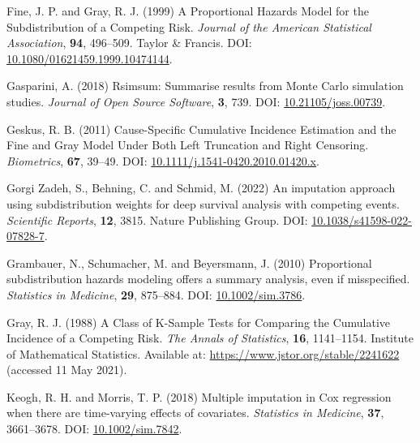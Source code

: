 \documentclass[
  letterpaper,
  DIV=11,
  numbers=noendperiod]{scrreprt}
\newlength{\cslhangindent}
\newlength{\cslentryspacingunit} %
\newenvironment{CSLReferences}[2] %
 {%
  \setlength{\parindent}{0pt}
  \ifodd #1
  \let\oldpar\par
  \def\par{\hangindent=\cslhangindent\oldpar}
  \fi
  \setlength{\parskip}{#2\cslentryspacingunit}
 }%
 {}
\begin{document}
\begin{CSLReferences}{1}{0}
\leavevmode{}%
Fine, J. P. and Gray, R. J. (1999) A {Proportional Hazards Model} for
the {Subdistribution} of a {Competing Risk}. \emph{Journal of the
American Statistical Association}, \textbf{94}, 496--509. Taylor \&
Francis. DOI:
\href{https://doi.org/10.1080/01621459.1999.10474144}{10.1080/01621459.1999.10474144}.

\leavevmode{}%
Gasparini, A. (2018) Rsimsum: {Summarise} results from {Monte Carlo}
simulation studies. \emph{Journal of Open Source Software}, \textbf{3},
739. DOI:
\href{https://doi.org/10.21105/joss.00739}{10.21105/joss.00739}.

\leavevmode{}%
Geskus, R. B. (2011) Cause-{Specific Cumulative Incidence Estimation}
and the {Fine} and {Gray Model Under Both Left Truncation} and {Right
Censoring}. \emph{Biometrics}, \textbf{67}, 39--49. DOI:
\href{https://doi.org/10.1111/j.1541-0420.2010.01420.x}{10.1111/j.1541-0420.2010.01420.x}.

\leavevmode{}%
Gorgi Zadeh, S., Behning, C. and Schmid, M. (2022) An imputation
approach using subdistribution weights for deep survival analysis with
competing events. \emph{Scientific Reports}, \textbf{12}, 3815. Nature
Publishing Group. DOI:
\href{https://doi.org/10.1038/s41598-022-07828-7}{10.1038/s41598-022-07828-7}.

\leavevmode{}%
Grambauer, N., Schumacher, M. and Beyersmann, J. (2010) Proportional
subdistribution hazards modeling offers a summary analysis, even if
misspecified. \emph{Statistics in Medicine}, \textbf{29}, 875--884. DOI:
\href{https://doi.org/10.1002/sim.3786}{10.1002/sim.3786}.

\leavevmode{}%
Gray, R. J. (1988) A {Class} of {K-Sample Tests} for {Comparing} the
{Cumulative Incidence} of a {Competing Risk}. \emph{The Annals of
Statistics}, \textbf{16}, 1141--1154. Institute of Mathematical
Statistics. Available at: \url{https://www.jstor.org/stable/2241622}
(accessed 11 May 2021).

\leavevmode{}%
Keogh, R. H. and Morris, T. P. (2018) Multiple imputation in {Cox}
regression when there are time-varying effects of covariates.
\emph{Statistics in Medicine}, \textbf{37}, 3661--3678. DOI:
\href{https://doi.org/10.1002/sim.7842}{10.1002/sim.7842}.


\end{CSLReferences}
\end{document}
